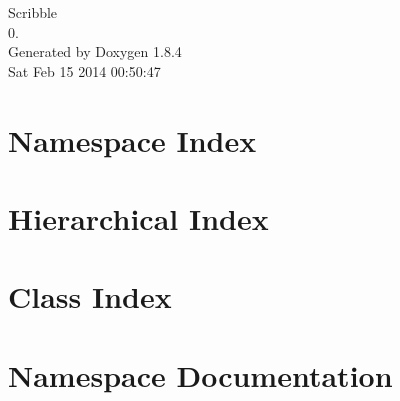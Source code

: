 \documentclass[twoside]{book}
\newcommand{\clearemptydoublepage}{%
  \newpage{\pagestyle{empty}\cleardoublepage}%
}
\begin{document}
\hypersetup{pageanchor=false}
\begin{titlepage}
\vspace*{7cm}
\begin{center}%
{\Large Scribble \\[1ex]\large 0. }\\
\vspace*{1cm}
{\large Generated by Doxygen 1.8.4}\\
\vspace*{0.5cm}
{\small Sat Feb 15 2014 00:50:47}\\
\end{center}
\end{titlepage}
\clearemptydoublepage
\tableofcontents
\clearemptydoublepage
{}
\hypersetup{pageanchor=true}

\chapter{Namespace Index}

\chapter{Hierarchical Index}

\chapter{Class Index}

\chapter{Namespace Documentation}

\end{document}

